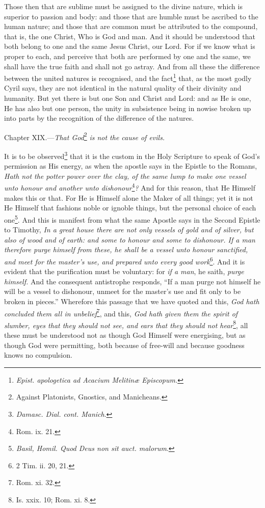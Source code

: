 Those then that are sublime must be assigned to the divine nature, which is superior to passion and body: and those that are humble must be ascribed to the human nature; and those that are common must be attributed to the compound, that is, the one Christ, Who is God and man. And it should be understood that both belong to one and the same Jesus Christ, our Lord. For if we know what is proper to each, and perceive that both are performed by one and the same, we shall have the true faith and shall not go astray. And from all these the difference between the united natures is recognised, and the fact\footnote{\emph{Epist. apologetica ad Acacium Melitinæ Episcopum.}} that, as the most godly Cyril says, they are not identical in the natural quality of their divinity and humanity. But yet there is but one Son and Christ and Lord: and as He is one, He has also but one person, the unity in subsistence being in nowise broken up into parts by the recognition of the difference of the natures.


Chapter XIX.—\emph{That God}\footnote{Against Platonists, Gnostics, and Manicheans.} \emph{is not the cause of evils.}

It is to be observed\footnote{\emph{Damasc. Dial. cont. Manich}.} that it is the custom in the Holy Scripture to speak of God’s permission as His energy, as when the apostle says in the Epistle to the Romans, \emph{Hath not the potter power over the clay, of the same lump to make one vessel unto honour and another unto dishonour}\footnote{Rom. ix. 21.}\emph{? }And for this reason, that He Himself makes this or that. For He is Himself alone the Maker of all things; yet it is not He Himself that fashions noble or ignoble things, but the personal choice of each one\footnote{\emph{Basil, Homil. Quod Deus non sit auct. malorum}.}. And this is manifest from what the same Apostle says in the Second Epistle to Timothy, \emph{In a great house there are not only vessels of gold and of silver, but also of wood and of earth: and some to honour and some to dishonour. If a man therefore purge himself from these, he shall be a vessel unto honour sanctified, and meet for the master’s use, and prepared unto every good work}\footnote{2 Tim. ii. 20, 21.}. And it is evident that the purification must be voluntary: for \emph{if a man}, he saith, \emph{purge himself. }And the consequent antistrophe responds, “If a man purge not himself he will be a vessel to dishonour, unmeet for the master’s use and fit only to be broken in pieces.” Wherefore this passage that we have quoted and this, \emph{God hath concluded them all in unbelief}\footnote{Rom. xi. 32.}, and this, \emph{God hath given them the spirit of slumber, eyes that they should not see, and ears that they should not hear}\footnote{Is. xxix. 10; Rom. xi. 8.}, all these must be understood not as though God Himself were energising, but as though God were permitting, both because of free-will and because goodness knows no compulsion.

